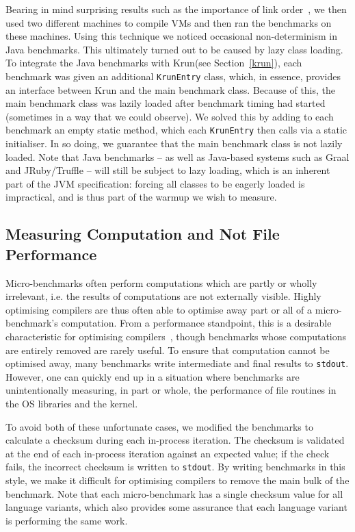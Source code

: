 \documentclass[preprint,numbers,10pt]{sigplanconf}
\newcommand{\krun}{Krun\xspace}
\begin{document}
Bearing in mind surprising
results such as the importance of link order~\cite{mytkowicz09surprising}, we
then used two different machines to compile VMs and then ran the benchmarks
on these machines.
Using this technique we noticed occasional non-determinism in Java benchmarks.
This ultimately turned out to be caused by lazy class loading. To integrate
the Java benchmarks with \krun (see Section~\ref{krun}), each
benchmark was given an additional \texttt{KrunEntry} class,
which, in essence, provides an interface between \krun and the main benchmark
class. Because of this, the main benchmark class was lazily loaded after
benchmark timing had started (sometimes in a way that we could observe). We
solved this by adding to each benchmark an empty static method, which each
\texttt{KrunEntry} then calls via a static initialiser. In so doing, we
guarantee that the main benchmark class is not lazily loaded. Note that Java
benchmarks -- as well as
Java-based systems such as Graal and JRuby/Truffle -- will still be subject to
lazy loading, which is an inherent part of the JVM specification: forcing all
classes to be eagerly loaded is impractical, and is thus part of the warmup we
wish to measure.

\subsection{Measuring Computation and Not File Performance}

Micro-benchmarks often perform computations which are partly or wholly
irrelevant, i.e. the results of computations are not externally visible. Highly
optimising compilers are thus often able to optimise away part or all of a
micro-benchmark's computation. From a performance standpoint, this is a
desirable characteristic for
optimising compilers~\cite{seaton15phd}, though benchmarks whose computations
are entirely removed are rarely useful. To ensure that computation cannot
be optimised away, many benchmarks write intermediate and final results
to \texttt{stdout}. However, one can quickly end up in a situation where benchmarks are
unintentionally measuring, in part or whole, the performance of file routines in
the OS libraries and the kernel.

To avoid both of these unfortunate cases,
we modified the benchmarks to calculate a checksum during each in-process iteration.
The checksum is validated at the end of each in-process iteration against an expected
value; if the check fails, the incorrect checksum is written to \texttt{stdout}.
By writing benchmarks in
this style, we make it difficult for optimising compilers to remove the
main bulk of the benchmark. Note that each micro-benchmark has a single checksum value for all
language variants, which also provides some assurance that each language variant is
performing the same work.
\end{document}
